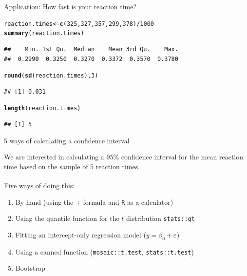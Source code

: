 \documentclass[10pt,handout]{beamer}\usepackage[]{graphicx}\usepackage[]{color}
\makeatletter
\newcommand{\hlnum}[1]{\textcolor[rgb]{0.686,0.059,0.569}{#1}}%
\newcommand{\hlopt}[1]{\textcolor[rgb]{0,0,0}{#1}}%
\newcommand{\hlstd}[1]{\textcolor[rgb]{0.345,0.345,0.345}{#1}}%
\newcommand{\hlkwb}[1]{\textcolor[rgb]{0.69,0.353,0.396}{#1}}%
\newcommand{\hlkwd}[1]{\textcolor[rgb]{0.737,0.353,0.396}{\textbf{#1}}}%
\newenvironment{kframe}{%
 \def\at@end@of@kframe{}%
 \ifinner\ifhmode%
  \def\at@end@of@kframe{\end{minipage}}%
  \begin{minipage}{\columnwidth}%
 \fi\fi%
 \def\FrameCommand##1{\hskip\@totalleftmargin \hskip-\fboxsep
 \colorbox{shadecolor}{##1}\hskip-\fboxsep
     \hskip-\linewidth \hskip-\@totalleftmargin \hskip\columnwidth}%
 \MakeFramed {\advance\hsize-\width
   \@totalleftmargin\z@ \linewidth\hsize
   \@setminipage}}%
 {\par\unskip\endMakeFramed%
 \at@end@of@kframe}
\newenvironment{knitrout}{}{} %
\makeatother
\begin{document}
\begin{frame}[fragile]{Application: How fast is your reaction time?}
\begin{knitrout}\tiny
{}\color{fgcolor}\begin{kframe}
\begin{alltt}
\hlstd{reaction.times} \hlkwb{<-} \hlkwd{c}\hlstd{(}\hlnum{325}\hlstd{,}\hlnum{327}\hlstd{,}\hlnum{357}\hlstd{,}\hlnum{299}\hlstd{,}\hlnum{378}\hlstd{)}\hlopt{/}\hlnum{1000}
\hlkwd{summary}\hlstd{(reaction.times)}
\end{alltt}
\begin{verbatim}
##    Min. 1st Qu.  Median    Mean 3rd Qu.    Max. 
##  0.2990  0.3250  0.3270  0.3372  0.3570  0.3780
\end{verbatim}
\begin{alltt}
\hlkwd{round}\hlstd{(}\hlkwd{sd}\hlstd{(reaction.times),}\hlnum{3}\hlstd{)}
\end{alltt}
\begin{verbatim}
## [1] 0.031
\end{verbatim}
\begin{alltt}
\hlkwd{length}\hlstd{(reaction.times)}
\end{alltt}
\begin{verbatim}
## [1] 5
\end{verbatim}
\end{kframe}
\end{knitrout}
	
\end{frame}


\begin{frame}[fragile]{5 ways of calculating a confidence interval}
	
	We are interested in calculating a 95\% confidence interval for the mean reaction time based on the sample of 5 reaction times. \\ \ \\
	\pause
	Five ways of doing this:
	\begin{enumerate}
		\setlength\itemsep{1em}
		\item By hand (using the $\pm$ formula and \texttt{R} as a calculator)
		\item Using the quantile function for the $t$ distribution \texttt{stats::qt}
		\item Fitting an intercept-only regression model ($y = \beta_0 + \varepsilon$)
		\item Using a canned function (\texttt{mosaic::t.test}, \texttt{stats::t.test})
		\item Bootstrap
	\end{enumerate}
	
\end{frame}
\end{document}
